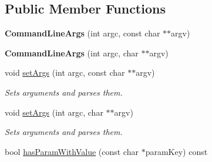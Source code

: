 \subsection*{Public Member Functions}
\begin{DoxyCompactItemize}
\item 
\hypertarget{classel_1_1base_1_1utils_1_1CommandLineArgs_a9872b14450e9cd1c1bd96227743c083b}{{\bfseries Command\-Line\-Args} (int argc, const char $\ast$$\ast$argv)}\label{classel_1_1base_1_1utils_1_1CommandLineArgs_a9872b14450e9cd1c1bd96227743c083b}

\item 
\hypertarget{classel_1_1base_1_1utils_1_1CommandLineArgs_a297b31b31829d9545d6e808f4be9195c}{{\bfseries Command\-Line\-Args} (int argc, char $\ast$$\ast$argv)}\label{classel_1_1base_1_1utils_1_1CommandLineArgs_a297b31b31829d9545d6e808f4be9195c}

\item 
\hypertarget{classel_1_1base_1_1utils_1_1CommandLineArgs_a2d59b4184e0a6a314ef1c9a4c6d946e6}{void \hyperlink{classel_1_1base_1_1utils_1_1CommandLineArgs_a2d59b4184e0a6a314ef1c9a4c6d946e6}{set\-Args} (int argc, const char $\ast$$\ast$argv)}\label{classel_1_1base_1_1utils_1_1CommandLineArgs_a2d59b4184e0a6a314ef1c9a4c6d946e6}

\begin{DoxyCompactList}\small\item\em Sets arguments and parses them. \end{DoxyCompactList}\item 
\hypertarget{classel_1_1base_1_1utils_1_1CommandLineArgs_af88a16e6ce7b5d48f9679f304367b27a}{void \hyperlink{classel_1_1base_1_1utils_1_1CommandLineArgs_af88a16e6ce7b5d48f9679f304367b27a}{set\-Args} (int argc, char $\ast$$\ast$argv)}\label{classel_1_1base_1_1utils_1_1CommandLineArgs_af88a16e6ce7b5d48f9679f304367b27a}

\begin{DoxyCompactList}\small\item\em Sets arguments and parses them. \end{DoxyCompactList}\item 
\hypertarget{classel_1_1base_1_1utils_1_1CommandLineArgs_acc9fa8eeed2deecffb6019173de5ab48}{bool \hyperlink{classel_1_1base_1_1utils_1_1CommandLineArgs_acc9fa8eeed2deecffb6019173de5ab48}{has\-Param\-With\-Value} (const char $\ast$param\-Key) const }\label{classel_1_1base_1_1utils_1_1CommandLineArgs_acc9fa8eeed2deecffb6019173de5ab48}


\end{DoxyCompactItemize}

